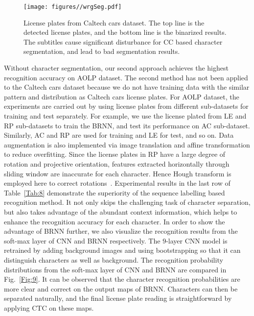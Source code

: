 \documentclass[twocolumn]{svjour3}
\begin{document}
\begin{figure}[tb]
\centering
\texttt{[image: figures//wrgSeg.pdf]}
\caption{License plates from Caltech cars dataset. The top line is the detected license plates, and the bottom line is the binarized results. The subtitles cause significant disturbance for CC based character segmentation, and lead to bad segmentation results.}
\label{Fig:6}
\end{figure}Without character segmentation, our second approach achieves the highest recognition accuracy on AOLP dataset. The second method has not been applied to the Caltech cars dataset because we do not have training data with the similar pattern and distribution as Caltech cars license plates. For AOLP dataset, the experiments are carried out by using license plates from different sub-datasets for training and test separately. For example, we use the license plated from LE and RP sub-datasets to train the BRNN, and test its performance on AC sub-dataset. Similarly, AC and RP are used for training and LE for test, and so on.
Data augmentation is also implemented via image translation and affine transformation to reduce overfitting. Since the license plates in RP have a large degree of rotation and projective orientation, features extracted horizontally through sliding window are inaccurate for each character. Hence Hough transform is employed here to correct rotations~\cite{Rasheed2012}. Experimental results in the last row of Table~\ref{Tab:8} demonstrate the superiority of the sequence labelling based recognition method. It not only skips the challenging task of character separation, but also takes advantage of the abundant context information, which helps to enhance the recognition accuracy for each character. %
In order to show the advantage of BRNN further, we also visualize the recognition results from the soft-max layer of CNN and BRNN respectively. The $9$-layer CNN model is retrained by adding background images and using bootstrapping so that it can distinguish characters as well as background. The recognition probability distributions from the soft-max layer of CNN and BRNN are compared in Fig.~\ref{Fig:9}. %
It can be observed that the character recognition probabilities are more clear and correct on the output maps of BRNN. Characters can then be separated naturally, and the final license plate reading is straightforward by applying CTC on these maps.
\end{document}
